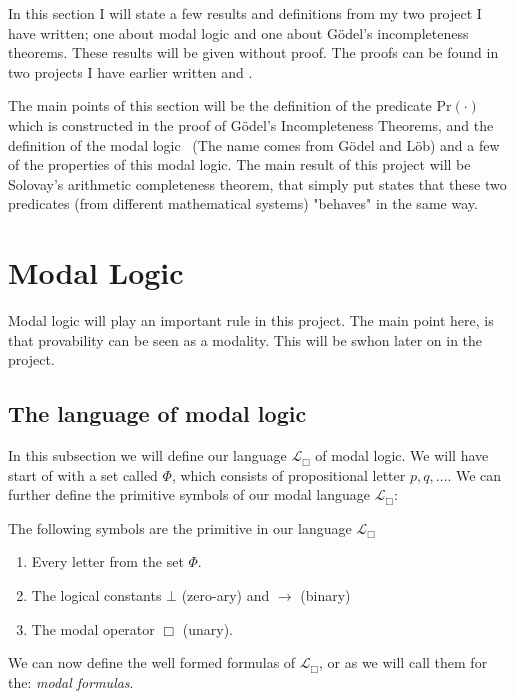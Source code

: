 \documentclass[../main.tex]{subfiles}
\begin{document}
In this section I will state a few results and definitions from my two project
I have written; one about modal logic and one about Gödel's incompleteness
theorems.
These results will be given without proof. The proofs can be found in
two projects I have earlier written \parencite{Thor2021} and \parencite{Thor2022}.

The main points of this section will be the definition of the predicate
$\text{Pr}(\cdot)$ which is constructed in the proof of  Gödel's Incompleteness
Theorems, and the definition of the modal logic \GL\
(The name comes from Gödel and Löb) and a few of the properties of this modal
logic. The
main result of this project will be Solovay's arithmetic completeness theorem,
that simply put states that these two predicates (from different mathematical
systems) "behaves" in the
same way.

\section{Modal Logic}
Modal logic will play an important rule in this project. The main point here,
is that provability can be seen as a modality. This will be swhon later on in
the project.

\subsection{The language of modal logic}
In this subsection we will define our language $\mathcal{L}_\Box$ of modal logic. 
We will have start of with a  set called $\Phi$, which consists of propositional letter
$p,q,\ldots$. We can further define the primitive symbols of our modal language
$\mathcal{L}_\Box$:

\begin{defi}
	The following symbols are the primitive in our language
	$\mathcal{L}_\Box$
	\begin{enumerate}
		\item Every letter from the set $\Phi$.
		\item The logical constants $\bot$ (zero-ary) and $\rightarrow$
			(binary)
		\item The modal operator $\Box$ (unary).
	\end{enumerate}
\end{defi}
We can now define the well formed formulas of $\mathcal{L}_\Box$, or as we will
call them for the: \textit{modal formulas}.
\end{document}
